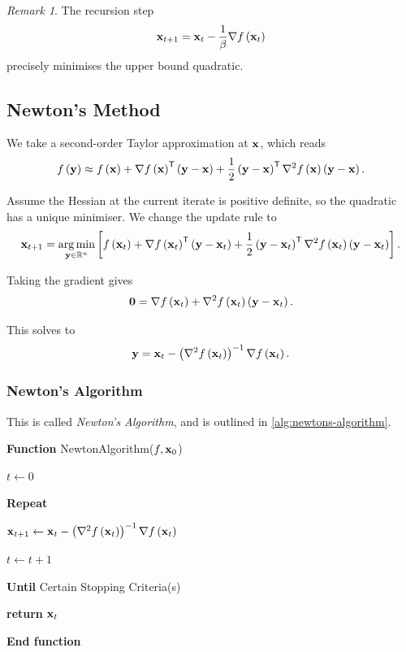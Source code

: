 \documentclass[11pt]{article}
\theoremstyle{definition}
\theoremstyle{remark}
\newtheorem{remark}[theorem]{Remark}
\newcommand{\pqty}[1]{\left(#1\right)}
\newcommand{\bqty}[1]{\left[#1\right]}
\newcommand{\RR}{\mathbb{R}}
\newcommand{\transpose}{^{\mathsf{T}}}
\newcommand{\inverse}{^{-1}}
\newcommand{\grad}{\nabla}
\DeclareMathOperator*{\argmin}{arg\,min}
\newenvironment{algorithmic}{\begin{list}{}{\setlength{\leftmargin}{1em}\setlength{\itemsep}{2pt}}}{\end{list}}
\newcommand{\State}{\item[]}
\newcommand{\Function}[2]{\item[]\textbf{Function }#1(#2)}
\newcommand{\EndFunction}{\item[]\textbf{End function}}
\newcommand{\Return}{\textbf{return } }
\newcommand{\Repeat}{\item[]\textbf{Repeat}}
\newcommand{\Until}[1]{\item[]\textbf{Until }#1}
\begin{document}
\begin{remark}\label{optim-unit-0019}
    The recursion step
    \[
        \vb{x}_{t + 1} = \vb{x}_t - \frac{1}{\beta} \grad f\pqty{\vb{x}_t}
    \]
    precisely minimises the upper bound quadratic.
\end{remark}

\subsection{Newton's Method}

We take a second-order Taylor approximation at \(\vb{x}\), which reads
\[
    f\pqty{\vb{y}} \approx f\pqty{\vb{x}} + \grad f\pqty{\vb{x}}\transpose \pqty{\vb{y} - \vb{x}} + \frac{1}{2} \pqty{\vb{y} - \vb{x}}\transpose \grad^2 f\pqty{\vb{x}} \pqty{\vb{y} - \vb{x}}.
\]

Assume the Hessian at the current iterate is positive definite, so the quadratic has a unique minimiser. We change the update rule to
\[
    \vb{x}_{t + 1} = \argmin_{\vb{y} \in \RR^n} \bqty{f\pqty{\vb{x}_t} + \grad f\pqty{\vb{x}_t}\transpose \pqty{\vb{y} - \vb{x}_t} + \frac{1}{2} \pqty{\vb{y} - \vb{x}_t}\transpose \grad^2 f\pqty{\vb{x}_t} \pqty{\vb{y} - \vb{x}_t}}.
\]

Taking the gradient gives
\[
    \vb{0} = \grad f\pqty{\vb{x}_t} + \grad^2 f\pqty{\vb{x}_t} \pqty{\vb{y} - \vb{x}_t}.
\]

This solves to
\[
    \vb{y} = \vb{x}_t - \pqty{\grad^2 f\pqty{\vb{x}_t}}\inverse \grad f\pqty{\vb{x}_t}.
\]

\subsubsection{Newton's Algorithm}

This is called \emph{Newton's Algorithm}, and is outlined in \autoref{alg:newtons-algorithm}.

\begin{algorithm}[ht!]
    \caption{Newton's Algorithm}\label{alg:newtons-algorithm}%
    \begin{algorithmic}
        \Function{NewtonAlgorithm}{\(f, \vb{x}_0\)}
        \State \(t \gets 0\)
        \Repeat
            \State \(\vb{x}_{t + 1} \gets \vb{x}_t - \pqty{\grad^2 f\pqty{\vb{x}_t}}\inverse \grad f\pqty{\vb{x}_t}\)
            \State \(t \gets t + 1\)
        \Until{Certain Stopping Criteria(s)}
        \State \Return{\(\vb{x}_{t}\)}
        \EndFunction
    \end{algorithmic}
\end{algorithm}
\end{document}
